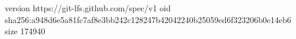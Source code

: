 version https://git-lfs.github.com/spec/v1
oid sha256:a948d6e5a81fc7af8e3bb242c128247b42042240b25059ed6f323206b0e14eb6
size 174940
